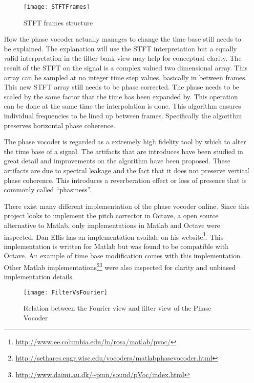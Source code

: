 \begin{wrapfigure}{L}{0.5\textwidth}
	\texttt{[image: STFTFrames]}
	\caption{STFT frames structure\protect\footnotemark}
	\label{fig:STFTFrames}
\end{wrapfigure}


How the phase vocoder actually manages to change the time base still needs to be
explained. The explanation will use the STFT interpretation but a equally valid
interpretation in the filter bank view may help for conceptual clarity. The
result of the STFT on the signal is a complex valued two dimensional array. This
array can be sampled at no integer time step values, basically in between frames.
This new STFT array still needs to be phase corrected. The phase needs to be
scaled by the same factor that the time has been expanded by\cite{DolsonTutorial}.
This operation can be done at the same time the interpolation is done. This
algorithm ensures individual frequencies to be lined up between frames.
Specifically the algorithm preserves horizontal phase coherence.

The phase vocoder is regarded as a extremely high fidelity tool by which to alter
the time base of a signal. The artifacts that are introduces have been studied in
great detail and improvements on the algorithm have been
proposed\cite{ImprovedPhaseVocoder}. These artifacts are due to spectral leakage
and the fact that it does not preserve vertical phase coherence. This introduces a
reverberation effect or loss of presence that is commonly called
``phasiness''\cite{ImprovedPhaseVocoder}.

There exist many different implementation of the phase vocoder online. Since this
project looks to implement the pitch corrector in Octave, a open source
alternative to Matlab, only implementations in Matlab and Octave were inspected.
Dan Ellis has an implementation availale on his
website\footnote{\url{http://www.ee.columbia.edu/ln/rosa/matlab/pvoc/}}. This
implementation is written for Matlab but was found to be compatible with Octave.
An example of time base modification comes with this implementation.
Other Matlab implementations\footnote{\url{http://sethares.engr.wisc.edu/vocoders/matlabphasevocoder.html}}\footnote{\url{http://www.daimi.au.dk/~pmn/sound/pVoc/index.html}}
were also inspected for clarity and unbiased implementation details.

\vfill
\begin{figure}[h]
\centering
	\texttt{[image: FilterVsFourier]}
	\caption{Relation between the Fourier view and filter view of the Phase
	Vocoder\cite{DolsonTutorial}}
	\label{fig:FilterVsFourier}
\end{figure}
